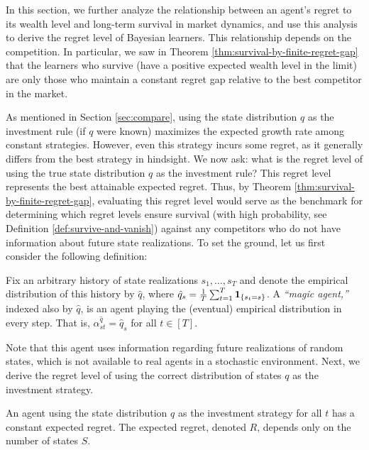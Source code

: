In this section, we further analyze the relationship between an agent's  regret to its wealth level and long-term survival in market dynamics, and use this analysis to derive the regret level of Bayesian learners. 
This relationship depends on the competition. In particular, we saw in Theorem \ref{thm:survival-by-finite-regret-gap} that the learners who survive (have a positive expected wealth level in the limit) are only those who maintain a constant regret gap relative to the best competitor in the market. 

As mentioned in Section \ref{sec:compare}, using the state distribution $q$ as the investment rule (if $q$ were known)  maximizes the expected growth rate among constant strategies. However, even this strategy incurs some regret, as it generally differs from the best strategy in hindsight. We now ask:  what is the regret level of using the true state distribution $q$ as the investment rule? This regret level represents the best attainable expected regret. Thus, by Theorem \ref{thm:survival-by-finite-regret-gap}, evaluating this regret level would serve as the benchmark for determining which regret levels ensure survival (with high probability, see Definition \ref{def:survive-and-vanish}) against any competitors who do not have information about future state realizations. 
To set the ground, let us first consider the following definition:

\begin{definition}
Fix an arbitrary history of state realizations $s_1,\dots,s_T$ and denote the empirical distribution of this history by $\hat{q}$, where $\hat{q}_s = \frac{1}{T}\sum_{t=1}^T \mathbf{1}_{\{s_t=s\}}$. A {\em ``magic agent,''} indexed also by $\hat{q}$, is an agent playing the (eventual) empirical distribution in every step. That is,  $\alpha^{\hat{q}}_{st} = \hat{q}_s$ for all $t \in [T]$.     
\end{definition}

Note that this agent uses information regarding future realizations of random states, which is not available to real agents in a stochastic environment. Next, we derive the regret level of using the correct distribution of states $q$ as the investment strategy.
\begin{theorem}\label{thm:regret-of-q}
    An agent using the state distribution $q$ as the investment strategy for all $t$ has a constant expected regret.
    The expected regret, denoted $R$, depends only on the number of states $S$. 
\end{theorem}

